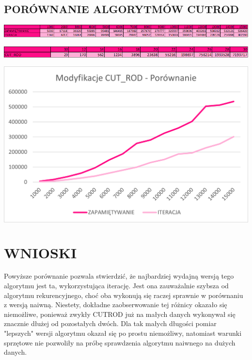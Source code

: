 \documentclass{article}
\begin{document}
	\subsection*{PORÓWNANIE ALGORYTMÓW CUTROD}
	\begin{center}
		\includegraphics[width = \textwidth]{Obraz8.png}
	\end{center}
	\begin{center}
		\includegraphics[width = \textwidth]{Obraz7.png}
	\end{center}
	\begin{center}
		\includegraphics[width = \textwidth]{Obraz3.png}
	\end{center}
	\section*{WNIOSKI}
	Powyższe porównanie pozwala stwierdzić, że najbardziej wydajną wersją tego algorytmu jest ta, wykorzystująca iterację. Jest ona zauważalnie szybsza od algorytmu rekurencyjnego, choć oba wykonują się raczej sprawnie w porównaniu z wersją naiwną. Niestety, dokładne zaobserwowanie tej różnicy okazało się niemożliwe, ponieważ zwykły CUTROD już na małych danych wykonywał się znacznie dłużej od pozostałych dwóch. Dla tak małych długości pomiar "lepszych" wersji algorytmu okazał się po prostu niemożliwy, natomiast warunki sprzętowe nie pozwoliły na próbę sprawdzenia algorytmu naiwnego na dużych danych.
\end{document}
